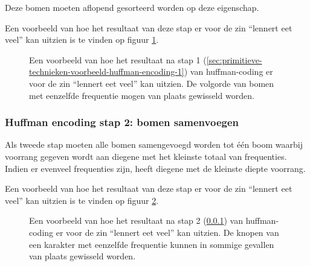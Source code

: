 Deze bomen moeten aflopend gesorteerd worden op deze eigenschap.

Een voorbeeld van hoe het resultaat van deze stap er voor de zin “lennert eet veel” kan uitzien is te vinden op figuur \ref{fig:huffman-stap-1}.

\FloatBarrier
\begin{figure}[h!]
	\caption{Een voorbeeld van hoe het resultaat na stap 1 (\ref{sec:primitieve-technieken-voorbeeld-huffman-encoding-1}) van \gls{huffman-coding} er voor de zin “lennert eet veel” kan uitzien. De volgorde van bomen met eenzelfde frequentie mogen van plaats gewisseld worden.}
	\label{fig:huffman-stap-1}
\end{figure}
\FloatBarrier

\subsubsection{Huffman encoding stap 2: bomen samenvoegen}
\label{sec:primitieve-technieken-voorbeeld-huffman-encoding-2}
Als tweede stap moeten alle bomen samengevoegd worden tot één boom waarbij voorrang gegeven wordt aan diegene met het kleinste totaal van frequenties. Indien er evenveel frequenties zijn, heeft diegene met de kleinste diepte voorrang.

Een voorbeeld van hoe het resultaat van deze stap er voor de zin “lennert eet veel” kan uitzien is te vinden op figuur \ref{fig:huffman-stap-2}.

\FloatBarrier
\begin{figure}[h!]
	\caption{Een voorbeeld van hoe het resultaat na stap 2 (\ref{sec:primitieve-technieken-voorbeeld-huffman-encoding-2}) van \gls{huffman-coding} er voor de zin “lennert eet veel” kan uitzien. De knopen van een karakter met eenzelfde frequentie kunnen in sommige gevallen van plaats gewisseld worden.}
	\label{fig:huffman-stap-2}
\end{figure}
\FloatBarrier

